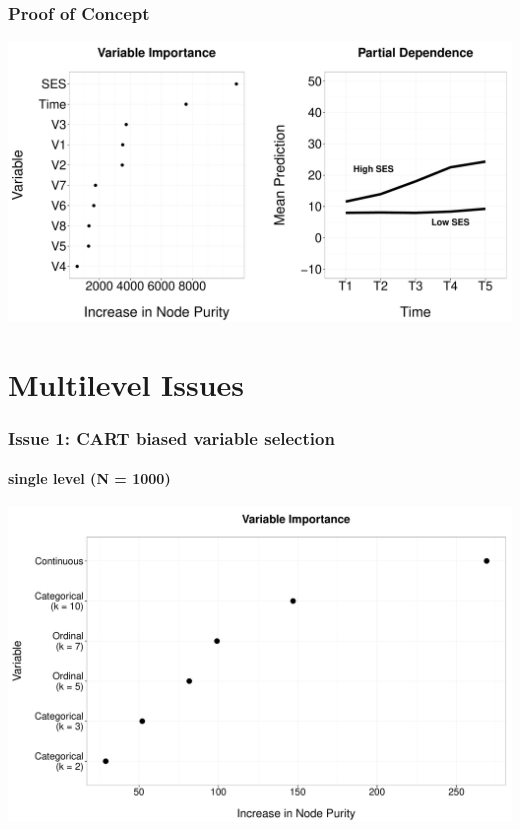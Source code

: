 \documentclass{beamer}\usepackage[]{graphicx}\usepackage[]{color}
\makeatletter
\def\maxwidth{ %
  \ifdim\Gin@nat@width>\linewidth
    \linewidth
  \else
    \Gin@nat@width
  \fi
}
\newenvironment{knitrout}{}{} %
\makeatother
\begin{document}

\begin{frame}
\frametitle{Proof of Concept}

\begin{knitrout}
\color{fgcolor}
\includegraphics[width=\maxwidth]{figure/longDataResults-1} 

\end{knitrout}

\end{frame}


\section{Multilevel Issues}
\begin{frame}
\frametitle{Issue 1: CART biased variable selection}
\framesubtitle{single level (N = 1000)}

\begin{knitrout}
\color{fgcolor}
\includegraphics[width=\maxwidth]{figure/bias_importance_lev1-1} 

\end{knitrout}

\end{frame}
\end{document}
